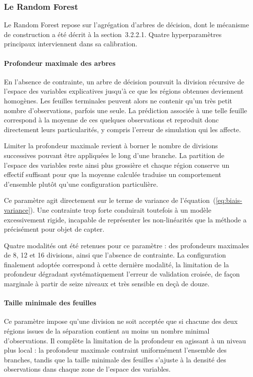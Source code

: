 \subsubsection{Le Random Forest}

Le Random Forest repose sur l'agrégation d'arbres de décision, dont le mécanisme de 
construction a été décrit à la section~3.2.2.1. Quatre hyperparamètres principaux 
interviennent dans sa calibration.

\paragraph{Profondeur maximale des arbres}
En l'absence de contrainte, un arbre de décision poursuit la division récursive de 
l'espace des variables explicatives jusqu'à ce que les régions obtenues deviennent 
homogènes. Les feuilles terminales peuvent alors ne contenir qu'un très petit nombre 
d'observations, parfois une seule. La prédiction associée à une telle feuille correspond 
à la moyenne de ces quelques observations et reproduit donc directement leurs 
particularités, y compris l'erreur de simulation qui les affecte.

Limiter la profondeur maximale revient à borner le nombre de divisions successives 
pouvant être appliquées le long d'une branche. La partition de l'espace des variables 
reste ainsi plus grossière et chaque région conserve un effectif suffisant pour que la 
moyenne calculée traduise un comportement d'ensemble plutôt qu'une configuration 
particulière.

Ce paramètre agit directement sur le terme de variance de 
l'équation~(\ref{eq:biais-variance}). Une contrainte trop forte conduirait toutefois à un 
modèle excessivement rigide, incapable de représenter les non-linéarités que la méthode a 
précisément pour objet de capter.

Quatre modalités ont été retenues pour ce paramètre : des profondeurs
maximales de 8, 12 et 16 divisions, ainsi que l'absence de contrainte. La
configuration finalement adoptée correspond à cette dernière modalité, la
limitation de la profondeur dégradant systématiquement l'erreur de validation
croisée, de façon marginale à partir de seize niveaux et très sensible en
deçà de douze.

\paragraph{Taille minimale des feuilles}
Ce paramètre impose qu'une division ne soit acceptée que si chacune des deux régions 
issues de la séparation contient au moins un nombre minimal d'observations. Il complète 
la limitation de la profondeur en agissant à un niveau plus local : la profondeur 
maximale contraint uniformément l'ensemble des branches, tandis que la taille minimale 
des feuilles s'ajuste à la densité des observations dans chaque zone de l'espace des 
variables.

